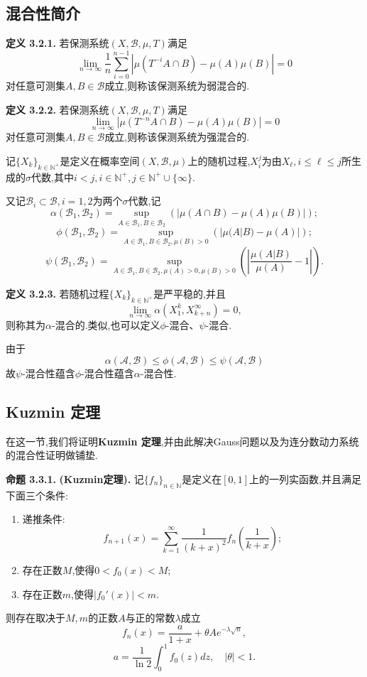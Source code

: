 \subsection{混合性简介}
\textbf{定义 3.2.1.  }
若保测系统$(X,\mathcal{B},\mu,T)$满足
$$\lim_{n\to\infty}{\frac{1}{n}}\sum_{i=0}^{n-1}|\mu(T^{-i}A\cap B)-\mu(A){\mu}(B)|=0$$
对任意可测集$A,B\in\mathcal{B}$成立,则称该保测系统为弱混合的.
\par
\textbf{定义 3.2.2.  }
若保测系统$(X,\mathcal{B},\mu,T)$满足
$$\lim\limits_{n\to\infty}\left|\mu(T^{-n}A\cap B)-\mu(A)\mu(B)\right|=0$$
对任意可测集$A,B\in\mathcal{B}$成立,则称该保测系统为强混合的.
\par
记$\{X_k\}_{k\in\mathbb{N^+}}$是定义在概率空间$(X,\mathcal{B},\mu)$上的随机过程,$X_{i}^{j}$为由$X_{\ell},i\leqslant\ell\leqslant j$所生成的$\sigma$代数,其中$i< j,i\in\mathbb{N}^+,j\in\mathbb{N}^+\cup\{\infty\}$.\par
又记$\mathcal{B}_i\subset\mathcal{B},i=1,2$为两个$\sigma$代数,记
$$\alpha(\mathcal{B}_1,\mathcal{B}_2)=\sup_{A\in\mathcal{B}_1,B\in\mathcal{B}_2}\left(|\mu(A\cap B)-\mu(A)\mu(B)|\right);$$
$$\phi(\mathcal{B}_1,\mathcal{B}_2)=\sup_{A\in\mathcal{B}_1,B\in\mathcal{B}_2,\mu(B)>0}\left(|\mu(A|B)-\mu(A)|\right);$$
$$\psi(\mathcal{B}_1,\mathcal{B}_2)=\sup_{A\in\mathcal{B}_1,B\in\mathcal{B}_2,\mu(A)>0,\mu(B)>0}\left(\left|\frac{\mu(A|B)}{\mu(A)}-1\right|\right).$$
\par
\textbf{定义 3.2.3.  }
若随机过程$\{X_k\}_{k\in\mathbb{N^+}}$是严平稳的,并且
$$\lim_{n\to\infty}\alpha(X_{1}^{k},X_{k+n}^{\infty})=0,$$
则称其为$\alpha$-混合的.类似,也可以定义$\phi$-混合、$\psi$-混合.
\par
由于
$$\alpha(\mathcal{A},\mathcal{B})\leqslant\phi(\mathcal{A},\mathcal{B})\leqslant\psi(\mathcal{A},\mathcal{B})$$
故$\psi$-混合性蕴含$\phi$-混合性蕴含$\alpha$-混合性.
\subsection{Kuzmin 定理}
在这一节,我们将证明\textbf{Kuzmin 定理},并由此解决Gauss问题以及为连分数动力系统的混合性证明做铺垫.\par
\textbf{命题 3.3.1.  }\textsuperscript{\cite{Kuzmin,Khinchin,Iosifescu}}\textbf{(Kuzmin定理).  }
记$\{f_n\}_{n\in\mathbb{N}}$是定义在$[0,1]$上的一列实函数,并且满足下面三个条件:
\begin{enumerate}
    \item 递推条件:
    \begin{equation}\label{recur}
        f_{n+1}(x)=\sum\limits_{k=1}^{\infty}\dfrac{1}{(k+x)^{2}}f_{n}\left(\dfrac{1}{k+x}\right);
    \end{equation}
    \item 存在正数$M$,使得$0<f_0(x)<M$;
    \item 存在正数$m$,使得$|f_0'(x)|<m$.
\end{enumerate}
则存在取决于$M,m$的正数$A$与正的常数$\lambda$成立
\begin{equation}\label{Kuzmin}
f_{n}\left(x\right)=\frac{a}{1+x}+\theta A e^{-\lambda \sqrt{n}},
\end{equation}
$$a=\frac{1}{\ln2}\int_{0}^{1}f_{0}(z)d z,\quad|\theta|<1.$$
\par

